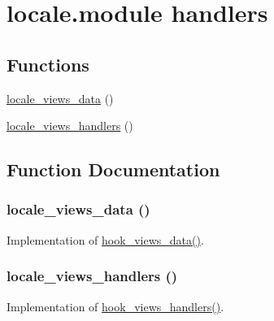 \hypertarget{group__views__locale__module}{
\section{locale.module handlers}
\label{group__views__locale__module}
}
\subsection*{Functions}
\begin{CompactItemize}
\item 
\hyperlink{group__views__locale__module_ga2e7c82021bc70c0e3842e8430318690}{locale\_\-views\_\-data} ()
\item 
\hyperlink{group__views__locale__module_g7fbf99e477b576fce39857cf869b3631}{locale\_\-views\_\-handlers} ()
\end{CompactItemize}


\subsection{Function Documentation}
\hypertarget{group__views__locale__module_ga2e7c82021bc70c0e3842e8430318690}{
\subsubsection[{locale\_\-views\_\-data}]{\setlength{\rightskip}{0pt plus 5cm}locale\_\-views\_\-data ()}}
\label{group__views__locale__module_ga2e7c82021bc70c0e3842e8430318690}


Implementation of \hyperlink{group__views__hooks_g227057901681e4a33e33c199c7a8c989}{hook\_\-views\_\-data()}. \hypertarget{group__views__locale__module_g7fbf99e477b576fce39857cf869b3631}{
\subsubsection[{locale\_\-views\_\-handlers}]{\setlength{\rightskip}{0pt plus 5cm}locale\_\-views\_\-handlers ()}}
\label{group__views__locale__module_g7fbf99e477b576fce39857cf869b3631}


Implementation of \hyperlink{group__views__hooks_gbf506f44bd8d8a86876f27396f5341ed}{hook\_\-views\_\-handlers()}. 